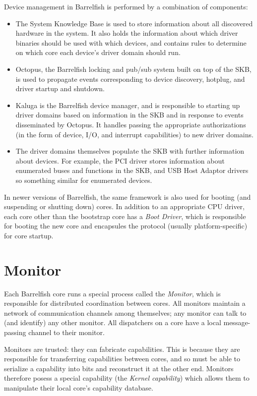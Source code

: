 \documentclass[a4paper,twoside]{report} %
\begin{document}
Device management in Barrelfish is performed by a combination of
components:
\begin{itemize}
\item The System Knowledge Base is used to store information about all
  discovered hardware in the system.  It also holds the information
  about which driver binaries should be used with which devices, and
  contains rules to determine on which core each device's driver domain
  should run. 
\item Octopus, the Barrelfish locking and pub/sub system built on top
  of the SKB, is used to propagate events corresponding to device
  discovery, hotplug, and driver startup and shutdown. 
\item Kaluga is the Barrelfish device manager, and is responsible to
  starting up driver domains based on information in the SKB and in
  response to events disseminated by Octopus.  It handles passing the
  appropriate authorizations (in the form of device, I/O, and
  interrupt capabilities) to new driver domains. 
\item The driver domains themselves populate the SKB with further
  information about devices. For example, the PCI driver stores
  information about enumerated buses and functions in the SKB, and USB
  Host Adaptor drivers so something similar for enumerated devices.
\end{itemize}

In newer versions of Barrelfish, the same framework is also used for
booting (and suspending or shutting down) cores.  In addition to an
appropriate CPU driver, each core other than the bootstrap core has a
\emph{Boot Driver}, which is responsible for booting the new core and
encapsules the protocol (usually platform-specific) for core startup. 

\section{Monitor}

Each Barrelfish core runs a special process called the \emph{Monitor},
which is responsible for distributed coordination between cores.  All
monitors maintain a network of communication channels among
themselves; any monitor can talk to (and identify) any other monitor.
All dispatchers on a core have a local message-passing channel to
their monitor. 

Monitors are trusted: they can fabricate capabilities. This is because
they are responsible for transferring capabilities between cores, and
so must be able to serialize a capability into bits and reconstruct it
at the other end.  Monitors therefore posess a special capability (the
\emph{Kernel capability}) which allows them to manipulate their local
core's capability database. 
\end{document}
